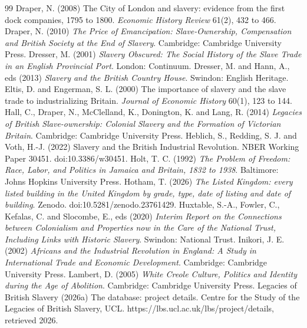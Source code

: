 \documentclass[11pt,a4paper]{article}
\begin{document}
\begin{thebibliography}{99}
 Draper, N. (2008) The City of London and slavery: evidence from the first dock companies, 1795 to 1800. \textit{Economic History Review} 61(2), 432 to 466.
 Draper, N. (2010) \textit{The Price of Emancipation: Slave-Ownership, Compensation and British Society at the End of Slavery}. Cambridge: Cambridge University Press.
 Dresser, M. (2001) \textit{Slavery Obscured: The Social History of the Slave Trade in an English Provincial Port}. London: Continuum.
 Dresser, M. and Hann, A., eds (2013) \textit{Slavery and the British Country House}. Swindon: English Heritage.
 Eltis, D. and Engerman, S. L. (2000) The importance of slavery and the slave trade to industrializing Britain. \textit{Journal of Economic History} 60(1), 123 to 144.
 Hall, C., Draper, N., McClelland, K., Donington, K. and Lang, R. (2014) \textit{Legacies of British Slave-ownership: Colonial Slavery and the Formation of Victorian Britain}. Cambridge: Cambridge University Press.
 Heblich, S., Redding, S. J. and Voth, H.-J. (2022) Slavery and the British Industrial Revolution. NBER Working Paper 30451. doi:10.3386/w30451.
 Holt, T. C. (1992) \textit{The Problem of Freedom: Race, Labor, and Politics in Jamaica and Britain, 1832 to 1938}. Baltimore: Johns Hopkins University Press.
 Hotham, T. (2026) \textit{The Listed Kingdom: every listed building in the United Kingdom by grade, type, date of listing and date of building}. Zenodo. doi:10.5281/zenodo.23761429.
 Huxtable, S.-A., Fowler, C., Kefalas, C. and Slocombe, E., eds (2020) \textit{Interim Report on the Connections between Colonialism and Properties now in the Care of the National Trust, Including Links with Historic Slavery}. Swindon: National Trust.
 Inikori, J. E. (2002) \textit{Africans and the Industrial Revolution in England: A Study in International Trade and Economic Development}. Cambridge: Cambridge University Press.
 Lambert, D. (2005) \textit{White Creole Culture, Politics and Identity during the Age of Abolition}. Cambridge: Cambridge University Press.
 Legacies of British Slavery (2026a) The database: project details. Centre for the Study of the Legacies of British Slavery, UCL. https://lbs.ucl.ac.uk/lbs/project/details, retrieved 2026.

\end{thebibliography}
\end{document}
